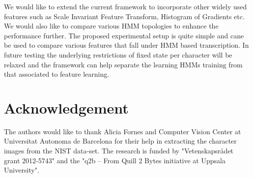\documentclass[runningheads]{llncs}
\begin{document}
We would like to extend the current framework to incorporate other widely used features such as Scale Invariant Feature Transform, Histogram of Gradients etc. We would also like to compare various HMM topologies to enhance the performance further. The proposed experimental setup is quite simple and cane be used to compare various features that fall under HMM based transcription. In future testing the underlying restrictions of fixed state per character will be relaxed and the framework can help separate the learning HMMs training from that associated to feature learning.

\section{Acknowledgement}
\label{sec:ackno}
The authors would like to thank Alicia Fornes and Computer Vision Center at Universitat Autonoma de Barcelona for their help in extracting the character images from the NIST data-set. The research is funded by "Vetenskapsr\r{a}det grant 2012-5743" and the "q2b -- From Quill 2 Bytes initiative at Uppsala University".

\nocite{bal:cha:gra:pae}


\end{document}
